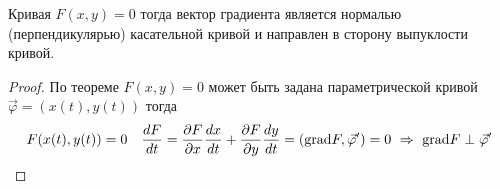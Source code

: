 \begin{block}
  Кривая $F(x, y) = 0$ тогда вектор градиента является нормалью
  (перпендикулярью) касательной кривой и направлен в сторону выпуклости кривой.
\end{block}

\begin{proof}
  По теореме $F(x,y) = 0$ может быть задана параметрической кривой
  $\vec \varphi = (x(t), y(t))$ тогда
  $$
  F(x(t), y(t)) = 0 ~~~
  \frac{dF}{dt} = \frac{\partial F}{\partial x} \frac{dx}{dt} +
  \frac{\partial F}{\partial y} \frac{dy}{dt} =
  (\mathrm{grad} F, \vec \varphi') = 0 ~ \Rightarrow ~ \mathrm{grad} F \perp \vec \varphi'
  $$
\end{proof}